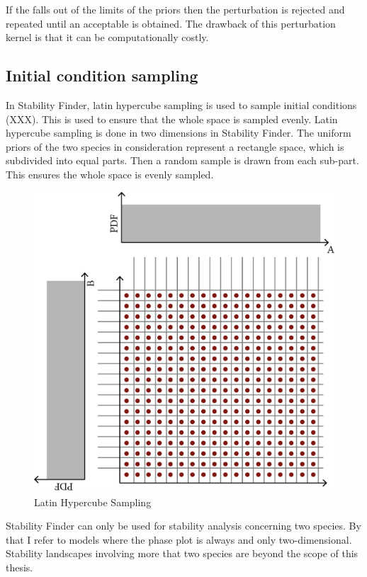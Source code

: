 {If the \texttheta* falls out of the limits of the priors then the perturbation is rejected and repeated until an acceptable \texttheta* is obtained. The drawback of this perturbation kernel is that it can be computationally costly.
\subsection{Initial condition sampling}

In Stability Finder, latin hypercube sampling is used to sample initial conditions (XXX). This is used to ensure that the whole space is sampled evenly. Latin hypercube sampling is done in two dimensions in Stability Finder. The uniform priors of the two species in consideration represent a rectangle space, which is subdivided into equal parts. Then a random sample is drawn from each sub-part. This ensures the whole space is evenly sampled. 

\begin{figure}[htbp]
\begin{center}
\includegraphics[scale=0.5]{chapterStabilityFinder/images/LHS.png}
\caption[LoF caption]{\label{fig:lhs}Latin Hypercube Sampling}
\end{center}
\end{figure}

Stability Finder can only be used for stability analysis concerning two species. By that I refer to models where the phase plot is always and only two-dimensional. Stability landscapes involving more that two species are beyond the scope of this thesis. 
\clearpage
}
